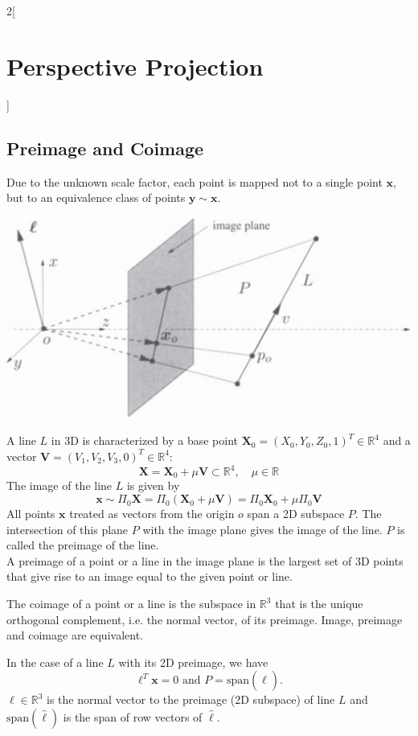 \documentclass[oneside,fontsize=11pt,paper=a4]{scrartcl}
\newenvironment{myfigure}
  {\par\medskip\noindent\minipage{\linewidth}}
  {\endminipage\par\medskip}
\begin{document}
\begin{multicols}{2}[\section{Perspective Projection}]
\subsection{Preimage and Coimage}
Due to the unknown scale factor, each point is mapped not to a single point $\boldsymbol{x}$, but to an equivalence class of points $\boldsymbol{y} \sim \boldsymbol{x}$.
\begin{myfigure}
	\centering
	\includegraphics[width=0.8\linewidth]{Images/preimage.PNG}
\end{myfigure}
A line $L$ in 3D is characterized by a base point $\boldsymbol{X}_0 = (X_0, Y_0, Z_0, 1)^T \in \mathbb{R}^4$ and a vector $\boldsymbol{V} = (V_1, V_2, V_3, 0)^T \in \mathbb{R}^4$:
\begin{equation*}
    \boldsymbol{X} = \boldsymbol{X}_0 + \mu \boldsymbol{V} \subset \mathbb{R}^4, \quad \mu \in \mathbb{R}
\end{equation*}
The image of the line $L$ is given by
\begin{equation*}
    \boldsymbol{x} \sim \Pi_0 \boldsymbol{X} = \Pi_0(\boldsymbol{X}_0 + \mu \boldsymbol{V}) = \Pi_0 \boldsymbol{X}_0 + \mu \Pi_0 \boldsymbol{V}
\end{equation*}
All points $\boldsymbol{x}$ treated as vectors from the origin $o$ span a 2D subspace $P$.
The intersection of this plane $P$ with the image plane gives the image of the line.
$P$ is called the preimage of the line.\\
A preimage of a point or a line in the image plane is the largest
set of 3D points that give rise to an image equal to the given
point or line.\par
\vspace{11pt}
The coimage of a point or a line is the subspace in $\mathbb{R}^3$ that is the unique orthogonal complement, i.e. the normal vector, of its preimage.
Image, preimage and coimage are equivalent.\par

In the case of a line $L$ with its 2D preimage, we have
\begin{equation*}
    \boldsymbol{\ell}^T \boldsymbol{x} = 0 \text{  and  } P = \text{span}(\hat{\boldsymbol{\ell}}).
\end{equation*}
$\boldsymbol{\ell} \in \mathbb{R}^3$ is the normal vector to the preimage (2D subspace) of line $L$ and $\text{span}(\hat{\boldsymbol{\ell}})$ is the span of row vectors of $\hat{\boldsymbol{\ell}}$.


\end{multicols}
\end{document}
